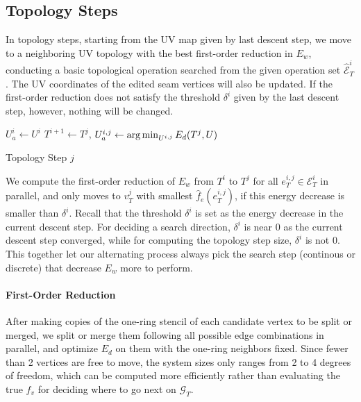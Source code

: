 
\subsection{Topology Steps}
\label{sec:topologyStep}

In topology steps, starting from the UV map given by last descent step, we move to a neighboring UV topology with the best first-order reduction in $E_w$, conducting a basic topological operation searched from the given operation set $\hat{\mathcal{E}}^i_T$. The UV coordinates of the edited seam vertices will also be updated. If the first-order reduction does not satisfy the threshold $\delta^i$ given by the last descent step, however, nothing will be changed.

\begin{algorithm}[h]
\SetAlgoLined
{}
$U_a^{i} \leftarrow U^i$\;
{
  $T^{i+1} \leftarrow T^j$, $U_a^{i,j} \leftarrow \operatorname*{arg\,min}_{U^{i,j}} E_d(T^j,U)$\;
}
\caption{Topology Step $j$}
\end{algorithm}

We compute the first-order reduction  of $E_w$ from $T^i$ to $T^j$ for all $e^{i,j}_T \in \mathcal{E}^i_T$ in parallel, and only moves to  $v^j_T$ with smallest $\hat{f}_e(e^{i,j}_{T})$, if this energy decrease is smaller than $\delta^i$. Recall that the threshold $\delta^i$ is set as the energy decrease in the current descent step. For deciding a search direction, $\delta^i$ is near $0$ as the current descent step converged, while for computing the topology step size, $\delta^i$ is not $0$. This together let our alternating process always pick the search step (continous or discrete) that decrease $E_w$ more to perform.

\paragraph{First-Order Reduction}
After making copies of the one-ring stencil of each candidate vertex to be split or merged, we split or merge them following all possible edge combinations in parallel, and optimize $E_d$ on them with the one-ring neighbors fixed. Since fewer than 2 vertices  are free to move, the system sizes only ranges from 2 to 4 degrees of freedom, which can be computed more efficiently rather than evaluating the true $f_v$ for deciding where to go next on $\mathcal{G}_T$.

